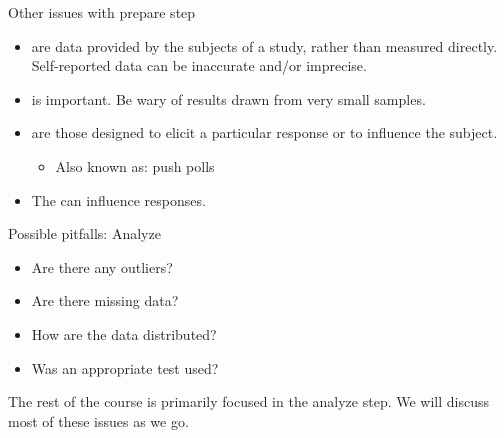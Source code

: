 \documentclass[xcolor=table, aspectratio=169, bigger]{beamer}
\begin{document}
\begin{frame}{Other issues with prepare step}
\begin{block}{}
\begin{itemize}
\item {} are data provided by the subjects of a study, rather than measured directly. Self-reported data can be inaccurate and/or imprecise.
\pause\item {} is important. Be wary of results drawn from very small samples.
\pause\item {} are those designed to elicit a particular response or to influence the subject.
\begin{itemize}
\item Also known as: push polls
\end{itemize}
\pause\item The  can influence responses.
\end{itemize}
\end{block}

\end{frame}

\begin{frame}{Possible pitfalls: Analyze}
 
\begin{block}{}
\begin{itemize}
\item Are there any outliers?
\item Are there missing data?
\item How are the data distributed?
\item Was an appropriate test used?
\end{itemize}
\end{block}

\begin{block}{}
The rest of the course is primarily focused in the analyze step. We will discuss most of these issues as we go.
\end{block}
\end{frame}
\end{document}

